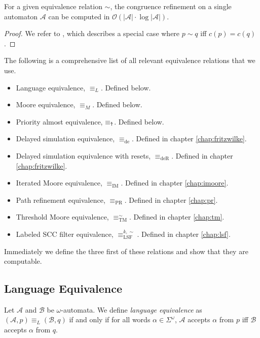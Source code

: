 \begin{lem}
	For a given equivalence relation $\sim$, the congruence refinement on a single automaton $\mathcal{A}$ can be computed in $\mathcal{O}(|\mathcal{A}| \cdot \log |\mathcal{A}|)$.
	\label{lem:general:congref_in_nlogn}
\end{lem}

\begin{proof}
	We refer to \cite{Hopcroft1971}, which describes a special case where $p \sim q$ iff $c(p) = c(q)$.
\end{proof}


\vspace{15pt}
The following is a comprehensive list of all relevant equivalence relations that we use.

\begin{itemize}
	\item Language equivalence, $\equiv_L$. Defined below.
	\item Moore equivalence, $\equiv_M$. Defined below.
	\item Priority almost equivalence, $\equiv_\text{\Ankh}$. Defined below.
	\item Delayed simulation equivalence, $\equiv_\text{de}$. Defined in chapter \ref{chap:fritzwilke}.
	\item Delayed simulation equivalence with resets, $\equiv_\text{deR}$. Defined in chapter \ref{chap:fritzwilke}.
	\item Iterated Moore equivalence, $\equiv_\text{IM}$. Defined in chapter \ref{chap:imoore}.
	\item Path refinement equivalence, $\equiv_\text{PR}$. Defined in chapter \ref{chap:pr}.
	\item Threshold Moore equivalence, $\equiv_\text{TM}^\sim$. Defined in chapter \ref{chap:tm}.
	\item Labeled SCC filter equivalence, $\equiv_\text{LSF}^{k,\sim}$. Defined in chapter \ref{chap:lsf}.
\end{itemize}

Immediately we define the three first of these relations and show that they are computable.

\vspace{5pt}

\subsection{Language Equivalence}

\begin{defn}
	Let $\mathcal{A}$ and $\mathcal{B}$ be $\omega$-automata. We define \emph{language equivalence} as $(\mathcal{A}, p) \equiv_L (\mathcal{B}, q)$ if and only if for all words $\alpha \in \Sigma^\omega$, $\mathcal{A}$ accepts $\alpha$ from $p$ iff $\mathcal{B}$ accepts $\alpha$ from $q$.
\end{defn}

